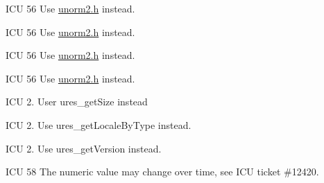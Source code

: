 \begin{DoxyRefList}
%
I\+CU 56 Use \mbox{\hyperlink{unorm2_8h}{unorm2.\+h}} instead.  
\item[Member \mbox{\hyperlink{unorm_8h_a5dad0d1ff63185c77c677bf5009621e6}{unorm\+\_\+quick\+Check\+With\+Options}} (const U\+Char $\ast$src, int32\+\_\+t src\+Length, U\+Normalization\+Mode mode, int32\+\_\+t options, U\+Error\+Code $\ast$p\+Error\+Code)]\label{deprecated__deprecated000055}%
%
I\+CU 56 Use \mbox{\hyperlink{unorm2_8h}{unorm2.\+h}} instead.  
\item[Member \mbox{\hyperlink{unorm_8h_aa94c5fdcac6a4b26211b612c3edc04ffa5b4745b8b611e2d7e6245c023e22e462}{U\+N\+O\+R\+M\+\_\+\+U\+N\+I\+C\+O\+D\+E\+\_\+3\+\_\+2}} ]\label{deprecated__deprecated000069}%
%
I\+CU 56 Use \mbox{\hyperlink{unorm2_8h}{unorm2.\+h}} instead.  
\item[Member \mbox{\hyperlink{unorm_8h_af317e3ace13f0ce7c86dd1ca48490ef7}{U\+Normalization\+Mode}} ]\label{deprecated__deprecated000050}%
%
I\+CU 56 Use \mbox{\hyperlink{unorm2_8h}{unorm2.\+h}} instead.  
\item[Member \mbox{\hyperlink{ures_8h_ac7e78fb1a607921c2174e53dc52b2d9e}{ures\+\_\+count\+Array\+Items}} (const U\+Resource\+Bundle $\ast$resource\+Bundle, const char $\ast$resource\+Key, U\+Error\+Code $\ast$err)]\label{deprecated__deprecated000070}%
%
I\+CU 2. User ures\+\_\+get\+Size instead  
\item[Member \mbox{\hyperlink{ures_8h_a5f5c83989df11a9c4ef5879091f462ca}{ures\+\_\+get\+Locale}} (const U\+Resource\+Bundle $\ast$resource\+Bundle, U\+Error\+Code $\ast$status)]\label{deprecated__deprecated000072}%
%
I\+CU 2. Use ures\+\_\+get\+Locale\+By\+Type instead.  
\item[Member \mbox{\hyperlink{ures_8h_ac54897145ed666cfb4c0e2b01d3d77ca}{ures\+\_\+get\+Version\+Number}} (const U\+Resource\+Bundle $\ast$resource\+Bundle)]\label{deprecated__deprecated000071}%
%
I\+CU 2. Use ures\+\_\+get\+Version instead.  
\item[Member \mbox{\hyperlink{ures_8h_a3f1197bf41a6228c38e3fddb58bf96fbaf5e9652169f8062eaaaf8e35accdf0d8}{U\+R\+E\+S\+\_\+\+L\+I\+M\+IT}} ]\label{deprecated__deprecated000082}%
%
I\+CU 58 The numeric value may change over time, see I\+CU ticket \#12420.  
\item[Member \mbox{\hyperlink{uscript_8h_a5036ff9ca2a7f1d2bde07875bb235df0a12e18aa66866154e14fd0f1cb19e7150}{U\+S\+C\+R\+I\+P\+T\+\_\+\+C\+O\+D\+E\+\_\+\+L\+I\+M\+IT}} ]\label{deprecated__deprecated000084}%

\end{DoxyRefList}
